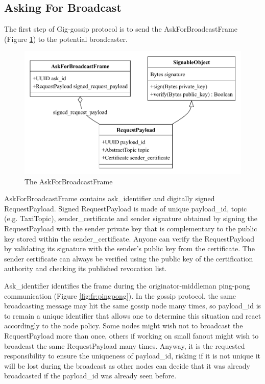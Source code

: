 \documentclass{article}
\begin{document}
\subsection{Asking For Broadcast}
The first step of Gig-gossip protocol is to send the AskForBroadcastFrame (Figure \ref{fig:fr:askforbroadcast}) to the potential broadcaster.

\begin{figure}
	\centering
	\includegraphics[scale=0.7]{AskForBroadcast.pdf}
	\caption{The AskForBroadcastFrame}
	\label{fig:fr:askforbroadcast}
\end{figure}

AskForBroadcastFrame contains ask\_identifier and digitally signed RequestPayload. Signed RequestPayload is made of unique payload\_id, topic (e.g. TaxiTopic), sender\_certificate and sender signature obtained by signing the RequestPayload with the sender private key that is complementary to the public key stored within the sender\_certificate. Anyone can verify the RequestPayload by validating its signature with the sender's public key from the certificate. The sender certificate can always be verified using the public key of the certification authority and checking its published revocation list.

Ask\_identifier identifies the frame during the originator-middleman ping-pong communication (Figure \ref{fig:fr:pingpong}). In the gossip protocol, the same broadcasting message may hit the same gossip node many times, so payload\_id is to remain a unique identifier that allows one to determine this situation and react accordingly to the node policy. Some nodes might wish not to broadcast the RequestPayload more than once, others if working on small fanout might wish to broadcast the same RequestPayload many times. Anyway, it is the requested responsibility to ensure the uniqueness of payload\_id, risking if it is not unique it will be lost during the broadcast as other nodes can decide that it was already broadcasted if the payload\_id was already seen before.
\end{document}
